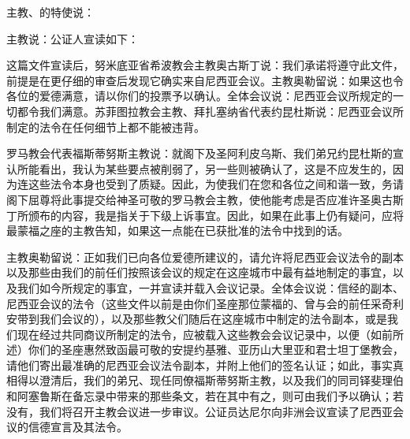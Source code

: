 主教、的特使说：\par

主教说：公证人宣读如下：\par

\par

这篇文件宣读后，努米底亚省希波教会主教奥古斯丁说：我们承诺将遵守此文件，前提是在更仔细的审查后发现它确实来自尼西亚会议。主教奥勒留说：如果这也令各位的爱德满意，请以你们的投票予以确认。全体会议说：尼西亚会议所规定的一切都令我们满意。苏菲图拉教会主教、拜扎塞纳省代表约昆杜斯说：尼西亚会议所制定的法令在任何细节上都不能被违背。\par

罗马教会代表福斯蒂努斯主教说：就阁下及圣阿利皮乌斯、我们弟兄约昆杜斯的宣认所能看出，我认为某些要点被削弱了，另一些则被确认了，这是不应发生的，因为连这些法令本身也受到了质疑。因此，为使我们在您和各位之间和谐一致，务请阁下屈尊将此事提交给神圣可敬的罗马教会主教，使他能考虑是否应准许圣奥古斯丁所颁布的内容，我是指关于下级上诉事宜。因此，如果在此事上仍有疑问，应将最蒙福之座的主教告知，如果这一点能在已获批准的法令中找到的话。\par

主教奥勒留说：正如我们已向各位爱德所建议的，请允许将尼西亚会议法令的副本以及那些由我们的前任们按照该会议的规定在这座城市中最有益地制定的事宜，以及我们如今所规定的事宜，一并宣读并载入会议记录。全体会议说：信经的副本、尼西亚会议的法令（这些文件以前是由你们圣座那位蒙福的、曾与会的前任采奇利安带到我们会议的），以及那些教父们随后在这座城市中制定的法令副本，或是我们现在经过共同商议所制定的法令，应被载入这些教会会议记录中，以便（如前所述）你们的圣座惠然致函最可敬的安提约基雅、亚历山大里亚和君士坦丁堡教会，请他们寄出最准确的尼西亚会议法令副本，并附上他们的签名认证；如此，事实真相得以澄清后，我们的弟兄、现任同僚福斯蒂努斯主教，以及我们的同司铎斐理伯和阿塞鲁斯在备忘录中带来的那些条文，若在其中有之，则可由我们予以确认；若没有，我们将召开主教会议进一步审议。公证员达尼尔向非洲会议宣读了尼西亚会议的信德宣言及其法令。\par

